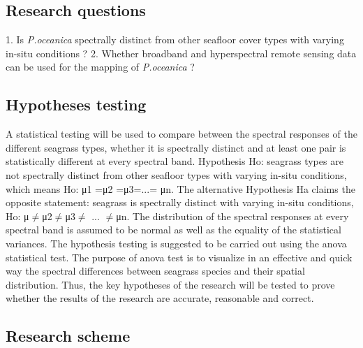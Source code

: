 \documentclass[10pt, a4paper]{article}
\begin{document}
\subsection{Research questions}
1. Is \textit{P.oceanica} spectrally distinct from other seafloor cover types with varying in-situ
conditions ?
2. Whether broadband and hyperspectral remote sensing data can be used for the mapping of
\textit{P.oceanica} ?

\subsection{Hypotheses testing}
A statistical testing will be used to compare between the spectral responses of the different seagrass
types, whether it is spectrally distinct and at least one pair is statistically different at every spectral
band.
Hypothesis Ho: seagrass types are not spectrally distinct from other seafloor types with
varying in-situ conditions, which means
Ho: μ1 =μ2 =μ3=...= μn.
The alternative Hypothesis Ha claims the opposite statement: seagrass is spectrally
distinct with varying in-situ conditions, Ho: μ$\neq$μ2$\neq$μ3$\neq$ ... $\neq$μn.
The distribution of the spectral responses at every spectral band is assumed to be normal as well as
the equality of the statistical variances.
The hypothesis testing is suggested to be carried out using the anova statistical test. The purpose of
anova test is to visualize in an effective and quick way the spectral differences between seagrass
species and their spatial distribution. Thus, the key hypotheses of the research will be tested to prove
whether the results of the research are accurate, reasonable and correct.

\subsection{Research scheme}
\end{document}
